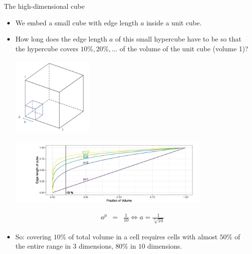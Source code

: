 \begin{vbframe}{The high-dimensional cube}

\begin{itemize}
  \item We embed a small cube with edge length $a$ inside a unit cube.
  \item How long does the edge length $a$ of this small hypercube have to be so that the hypercube covers $10\%, 20\%, ...$ of the volume of the unit cube (volume 1)?

  \medskip
  \begin{center}
    \includegraphics[height = 4cm, width = 4cm]{figure_man/hypercube.png}
  \end{center}

\framebreak

\vspace*{0.1cm}
\begin{center}
\includegraphics[width = 10cm ]{figure_man/high-dim-cube.png}
\end{center}

\medskip

  \begin{footnotesize}
  \begin{eqnarray*}
    a^p &=& \frac{1}{10} \Leftrightarrow a = \frac{1}{\sqrt[p]{10}}
  \end{eqnarray*}
  \end{footnotesize}
  \vspace*{-0.5cm}
  \item  So: covering $10\%$ of total volume in a cell requires cells with almost $50\%$ of the entire range in $3$ dimensions, $80\%$ in $10$ dimensions.
\end{itemize}

\end{vbframe}


